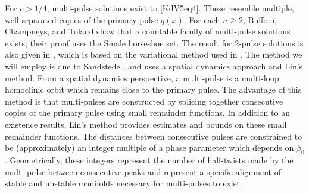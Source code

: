 \documentclass[11pt,reqno]{amsart}
\theoremstyle{plain}
\theoremstyle{definition}
\theoremstyle{remark}
\begin{document}
For $c > 1/4$, multi-pulse solutions exist to \cref{KdV5eq4}. These resemble multiple, well-separated copies of the primary pulse $q(x)$. For each $n \geq 2$, Buffoni, Champneys, and Toland \cite{Buffoni1996} show that a countable family of multi-pulse solutions exists; their proof uses the Smale horseshoe set. The result for 2-pulse solutions is also given in \cite[Theorem 2.2]{Pelinovsky2007}, which is based on the variational method used in \cite{Buffoni1996}. The method we will employ is due to Sandstede \cite{Sandstede1993, SandstedeStrut}, and uses a spatial dynamics approach and Lin's method. From a spatial dynamics perspective, a multi-pulse is a multi-loop homoclinic orbit which remains close to the primary pulse. The advantage of this method is that multi-pulses are constructed by splicing together consecutive copies of the primary pulse using small remainder functions. In addition to an existence results, Lin's method provides estimates and bounds on these small remainder functions. The distances between consecutive pulses are constrained to be (approximately) an integer multiple of a phase parameter which depends on $\beta_0$. Geometrically, these integers represent the number of half-twists made by the multi-pulse between consecutive peaks and represent a specific alignment of stable and unstable manifolds necessary for multi-pulses to exist. 
\end{document}
